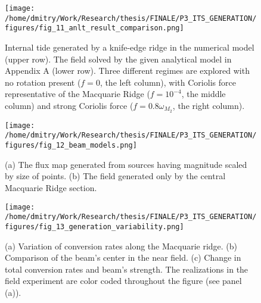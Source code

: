 \documentclass[12pt]{article}
\begin{document}
\begin{figure}
	\centering
	\texttt{[image: /home/dmitry/Work/Research/thesis/FINALE/P3\_ITS\_GENERATION/figures/fig\_11\_anlt\_result\_comparison.png]}
	\caption{Internal tide generated by a knife-edge ridge in the numerical model (upper row). The 
	field solved by the given analytical model in Appendix A (lower row). Three different regimes 
	are explored with no rotation present ($f = 0$, the left column), with Coriolis force 
	representative of the Macquarie Ridge ($f = 10^{-4}$, the middle column) and strong Coriolis 
	force ($f = 0.8 \omega_{M_2}$, the right column).}
	\label{C3.fig:anlt_sol}
\end{figure}

\begin{figure}
	\centering
	\texttt{[image: /home/dmitry/Work/Research/thesis/FINALE/P3\_ITS\_GENERATION/figures/fig\_12\_beam\_models.png]}
	\caption{(a) The flux map generated from sources having magnitude scaled by size of points. (b) 
	The field generated only by the central Macquarie Ridge section.}
	\label{C3.fig:beam_inv}
\end{figure}

\begin{figure}
	\centering
	\texttt{[image: /home/dmitry/Work/Research/thesis/FINALE/P3\_ITS\_GENERATION/figures/fig\_13\_generation\_variability.png]}
	\caption{(a) Variation of conversion rates along the Macquarie ridge. (b) Comparison of the 
	beam's center in the near field. (c) Change in total conversion rates and beam's strength. The 
	realizations in the field experiment are color coded throughout the figure (see panel (a)).}
	\label{C3.fig:gen_var_beam}
\end{figure}

%




\end{document}
